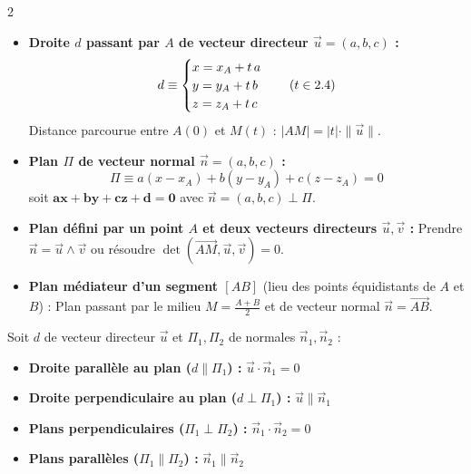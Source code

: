 {\begin{multicols}{2}
\vspace{4pt}
\begin{itemize}[leftmargin=1.2em, itemsep=2pt, topsep=2pt]
    \item \textbf{Droite $d$ passant par $A$ de vecteur directeur $\vec{u} = (a,b,c)$ :}
    \[
        d \equiv \begin{cases} x = x_A + t\,a \\ y = y_A + t\,b \\ z = z_A + t\,c \end{cases} \quad (t \in 2.4)
    \]
    Distance parcourue entre $A(0)$ et $M(t)$ : $|AM| = |t|\cdot\|\vec{u}\|$.
    \item \textbf{Plan $\Pi$ de vecteur normal $\vec{n} = (a,b,c)$ :}
    \[
        \Pi \equiv a(x-x_A) + b(y-y_A) + c(z-z_A) = 0
    \]
    soit $\mathbf{ax + by + cz + d = 0}$ avec $\vec{n} = (a,b,c) \perp \Pi$.
    \item \textbf{Plan défini par un point $A$ et deux vecteurs directeurs $\vec{u}, \vec{v}$ :} Prendre $\vec{n} = \vec{u} \wedge \vec{v}$ ou résoudre $\det(\overrightarrow{AM},\vec{u},\vec{v}) = 0$.
    \item \textbf{Plan médiateur d'un segment $[AB]$} (lieu des points équidistants de $A$ et $B$) : Plan passant par le milieu $M = \frac{A+B}{2}$ et de vecteur normal $\vec{n} = \overrightarrow{AB}$.
\end{itemize}

\vspace{4pt}
Soit $d$ de vecteur directeur $\vec{u}$ et $\Pi_1, \Pi_2$ de normales $\vec{n}_1, \vec{n}_2$ :
\begin{itemize}[leftmargin=1.2em, itemsep=2pt, topsep=2pt]
    \item \textbf{Droite parallèle au plan ($d \parallel \Pi_1$) :} $\vec{u} \cdot \vec{n}_1 = 0$
    \item \textbf{Droite perpendiculaire au plan ($d \perp \Pi_1$) :} $\vec{u} \parallel \vec{n}_1$
    \item \textbf{Plans perpendiculaires ($\Pi_1 \perp \Pi_2$) :} $\vec{n}_1 \cdot \vec{n}_2 = 0$
    \item \textbf{Plans parallèles ($\Pi_1 \parallel \Pi_2$) :} $\vec{n}_1 \parallel \vec{n}_2$
\end{itemize}

\columnbreak


\end{multicols}}
